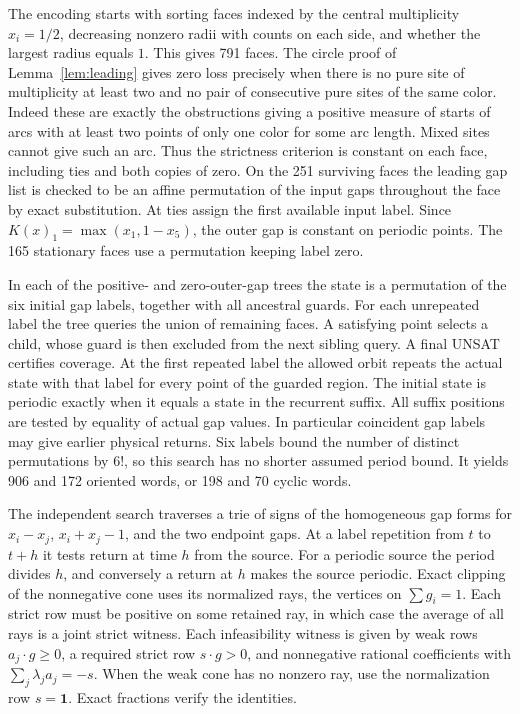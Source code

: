 \documentclass[11pt,reqno]{amsart}
\theoremstyle{remark}
\begin{document}
The encoding starts with sorting faces indexed by the central multiplicity \(x_i=1/2\), decreasing nonzero radii with counts on each side, and whether the largest radius equals \(1\). This gives 791 faces. The circle proof of Lemma~\ref{lem:leading} gives zero loss precisely when there is no pure site of multiplicity at least two and no pair of consecutive pure sites of the same color. Indeed these are exactly the obstructions giving a positive measure of starts of arcs with at least two points of only one color for some arc length. Mixed sites cannot give such an arc. Thus the strictness criterion is constant on each face, including ties and both copies of zero. On the 251 surviving faces the leading gap list is checked to be an affine permutation of the input gaps throughout the face by exact substitution. At ties assign the first available input label. Since \(K(x)_1=\max(x_1,1-x_5)\), the outer gap is constant on periodic points. The 165 stationary faces use a permutation keeping label zero.

In each of the positive- and zero-outer-gap trees the state is a permutation of the six initial gap labels, together with all ancestral guards. For each unrepeated label the tree queries the union of remaining faces. A satisfying point selects a child, whose guard is then excluded from the next sibling query. A final UNSAT certifies coverage. At the first repeated label the allowed orbit repeats the actual state with that label for every point of the guarded region. The initial state is periodic exactly when it equals a state in the recurrent suffix. All suffix positions are tested by equality of actual gap values. In particular coincident gap labels may give earlier physical returns. Six labels bound the number of distinct permutations by \(6!\), so this search has no shorter assumed period bound. It yields 906 and 172 oriented words, or 198 and 70 cyclic words.

The independent search traverses a trie of signs of the homogeneous gap forms for \(x_i-x_j\), \(x_i+x_j-1\), and the two endpoint gaps. At a label repetition from \(t\) to \(t+h\) it tests return at time \(h\) from the source. For a periodic source the period divides \(h\), and conversely a return at \(h\) makes the source periodic. Exact clipping of the nonnegative cone uses its normalized rays, the vertices on \(\sum g_i=1\). Each strict row must be positive on some retained ray, in which case the average of all rays is a joint strict witness. Each infeasibility witness is given by weak rows \(a_j\cdot g\ge0\), a required strict row \(s\cdot g>0\), and nonnegative rational coefficients with \(\sum_j\lambda_j a_j=-s\). When the weak cone has no nonzero ray, use the normalization row \(s=\boldsymbol 1\). Exact fractions verify the identities.
\end{document}
